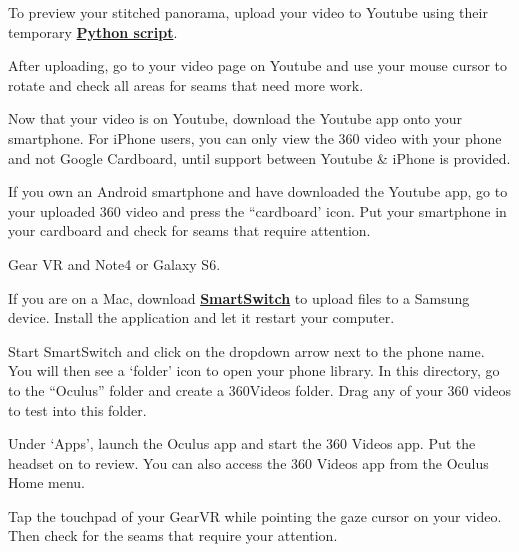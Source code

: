 \begin{fullwidth}
To preview your stitched panorama, upload your video to Youtube using their temporary \textbf{\href{https://www.youtube.com/watch?v=Z8VlD2rtACA}{Python script}}.

After uploading, go to your video page on Youtube and use your mouse cursor to rotate and check all areas for seams that need more work.

Now that your video is on Youtube, download the Youtube app onto your smartphone. For iPhone users, you can only view the 360 video with your phone and not Google Cardboard, until support between Youtube & iPhone is provided.

If you own an Android smartphone and have downloaded the Youtube app, go to your uploaded 360 video and press the “cardboard’ icon. Put your smartphone in your cardboard and check for seams that require attention.

{\large Gear VR and Note4 or Galaxy S6. \par}

If you are on a Mac, download \textbf{\href{https://www.dropbox.com/sh/8kqte3wtyt3vltu/AAAjUnNxtXhaxprWF8_q9zbCa?dl=0}{SmartSwitch}} to upload files to a Samsung device. Install the application and let it restart your computer.

Start SmartSwitch and click on the dropdown arrow next to the phone name. You will then see a ‘folder’ icon to open your phone library. In this directory, go to the “Oculus” folder and create a 360Videos folder. Drag any of your 360 videos to test into this folder.

Under ‘Apps’, launch the Oculus app and start the 360 Videos app. Put the headset on to review. You can also access the 360 Videos app from the Oculus Home menu.

Tap the touchpad of your GearVR while pointing the gaze cursor on your video. Then check for the seams that require your attention.

\clearpage
\end{fullwidth}